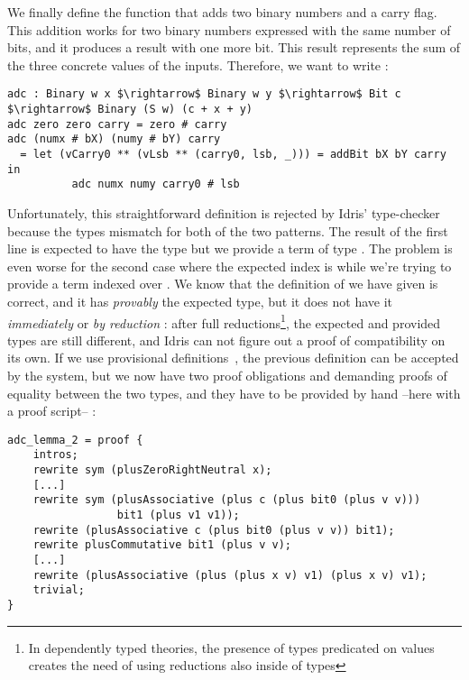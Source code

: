We finally define the function  that adds two binary numbers and a carry flag. This addition works for two binary numbers expressed with the same number of bits, and it produces a result with one more bit. This result represents the sum of the three concrete values of the inputs. Therefore, we want to write :

\begin{lstlisting}
adc : Binary w x $\rightarrow$ Binary w y $\rightarrow$ Bit c $\rightarrow$ Binary (S w) (c + x + y)
adc zero zero carry = zero # carry
adc (numx # bX) (numy # bY) carry
  = let (vCarry0 ** (vLsb ** (carry0, lsb, _))) = addBit bX bY carry in
          adc numx numy carry0 # lsb
\end{lstlisting}

Unfortunately, this straightforward definition is rejected by Idris' type-checker because the types mismatch for both of the two patterns. The result of the first line  is expected to have the type  but we provide a term of type .
The problem is even worse for the second case where the expected index is 
while we're trying to provide a term indexed over
.
We know that the definition of  we have given is correct, and it has \emph{provably} the expected type, but it does not have it \emph{immediately} or \emph{by reduction} : after full reductions\footnote{In dependently typed theories, the presence of types predicated on values creates the need of using reductions also inside of types}, the expected and provided types are still different, and Idris can not figure out a proof of compatibility on its own. 
If we use provisional definitions~\cite{DBLP:conf/plpv/Brady13}, the previous definition can be accepted by the system, but we now have two proof obligations  and  demanding proofs of equality between the two types, and they have to be provided by hand --here with a proof script-- :

\begin{lstlisting}
adc_lemma_2 = proof {
    intros;
    rewrite sym (plusZeroRightNeutral x);
    [...]
    rewrite sym (plusAssociative (plus c (plus bit0 (plus v v))) 
                 bit1 (plus v1 v1));
    rewrite (plusAssociative c (plus bit0 (plus v v)) bit1);
    rewrite plusCommutative bit1 (plus v v);
    [...]
    rewrite (plusAssociative (plus (plus x v) v1) (plus x v) v1);
    trivial;
}
\end{lstlisting}

